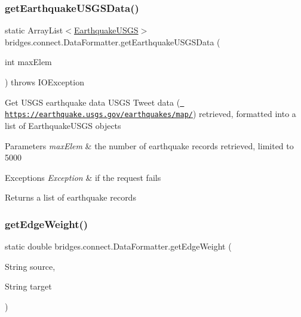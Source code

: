 \mbox{\label{classbridges_1_1connect_1_1_data_formatter_a31f1f3e398fbf7225c790dbbbde238dd}} 
\subsubsection{\texorpdfstring{getEarthquakeUSGSData()}{getEarthquakeUSGSData()}}
{\footnotesize\ttfamily static Array\+List$<$\mbox{\hyperlink{classbridges_1_1data__src__dependent_1_1_earthquake_u_s_g_s}{Earthquake\+U\+S\+GS}}$>$ bridges.\+connect.\+Data\+Formatter.\+get\+Earthquake\+U\+S\+G\+S\+Data (\begin{DoxyParamCaption}\item[{int}]{max\+Elem }\end{DoxyParamCaption}) throws I\+O\+Exception\hspace{0.3cm}{\ttfamily [static]}}

Get U\+S\+GS earthquake data U\+S\+GS Tweet data (\href{https://earthquake.usgs.gov/earthquakes/map/}{\texttt{ https\+://earthquake.\+usgs.\+gov/earthquakes/map/}}) retrieved, formatted into a list of Earthquake\+U\+S\+GS objects


\begin{DoxyParams}{Parameters}
{\em max\+Elem} & the number of earthquake records retrieved, limited to 5000 \\
\hline
\end{DoxyParams}

\begin{DoxyExceptions}{Exceptions}
{\em Exception} & if the request fails\\
\hline
\end{DoxyExceptions}
\begin{DoxyReturn}{Returns}
a list of earthquake records 
\end{DoxyReturn}
\mbox{\label{classbridges_1_1connect_1_1_data_formatter_a2637c733e7f4efccfb56de0940506318}} 
\subsubsection{\texorpdfstring{getEdgeWeight()}{getEdgeWeight()}}
{\footnotesize\ttfamily static double bridges.\+connect.\+Data\+Formatter.\+get\+Edge\+Weight (\begin{DoxyParamCaption}\item[{String}]{source,  }\item[{String}]{target }\end{DoxyParamCaption})\hspace{0.3cm}{\ttfamily [static]}}

